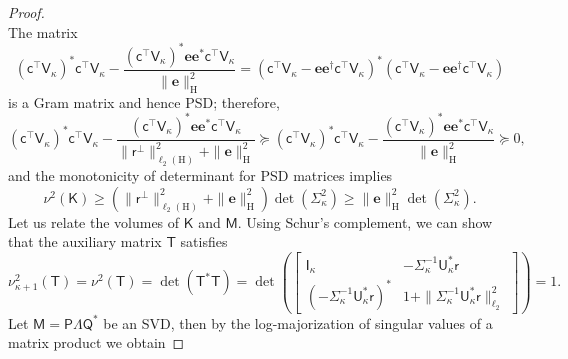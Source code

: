 \documentclass[onefignum,onetabnum]{siamart250211}
\renewenvironment{equation*}{\[}{\]\ignorespacesafterend}
\newcommand{\Hilb}{\mathrm{H}}
\newcommand{\Batrix}[1]{\bm{\Matrix{#1}}}
\newcommand{\Matrix}[1]{\mathsf{#1}}
\newcommand{\Bentry}[1]{{\bm{#1}}}
\newcommand{\trans}{\intercal}
\newcommand{\pinv}{\dagger}
\newcommand{\Norm}[3][]{#1\| #2 #1\|_{\mathrm{#3}}}
\begin{document}
\begin{proof}
\begin{equation*}
\end{equation*}
The matrix
\begin{equation*}
    (\Batrix{c}^\trans \Matrix{V}_{\kappa})^\ast \Batrix{c}^\trans \Matrix{V}_{\kappa} - \frac{(\Batrix{c}^\trans \Matrix{V}_{\kappa})^\ast \Bentry{e} \Bentry{e}^\ast \Batrix{c}^\trans \Matrix{V}_{\kappa}}{\Norm{\Bentry{e}}{\Hilb}^2} = (\Batrix{c}^\trans \Matrix{V}_{\kappa} - \Bentry{e} \Bentry{e}^\pinv \Batrix{c}^\trans \Matrix{V}_{\kappa})^\ast (\Batrix{c}^\trans \Matrix{V}_{\kappa} - \Bentry{e} \Bentry{e}^\pinv \Batrix{c}^\trans \Matrix{V}_{\kappa})
\end{equation*}
is a Gram matrix and hence PSD; therefore,
\begin{equation*}
    (\Batrix{c}^\trans \Matrix{V}_{\kappa})^\ast \Batrix{c}^\trans \Matrix{V}_{\kappa} - \frac{(\Batrix{c}^\trans \Matrix{V}_{\kappa})^\ast \Bentry{e} \Bentry{e}^\ast \Batrix{c}^\trans \Matrix{V}_{\kappa}}{\Norm{\Batrix{r}^\perp}{\ell_2(\Hilb)}^2 + \Norm{\Bentry{e}}{\Hilb}^2} \succcurlyeq (\Batrix{c}^\trans \Matrix{V}_{\kappa})^\ast \Batrix{c}^\trans \Matrix{V}_{\kappa} - \frac{(\Batrix{c}^\trans \Matrix{V}_{\kappa})^\ast \Bentry{e} \Bentry{e}^\ast \Batrix{c}^\trans \Matrix{V}_{\kappa}}{\Norm{\Bentry{e}}{\Hilb}^2} \succcurlyeq 0,
\end{equation*}
and the monotonicity of determinant for PSD matrices implies
\begin{equation*}
    \nu^2(\Batrix{K}) \geq (\Norm{\Batrix{r}^\perp}{\ell_2(\Hilb)}^2 + \Norm{\Bentry{e}}{\Hilb}^2) \det(\Matrix{\Sigma}_{\kappa}^2) \geq \Norm{\Bentry{e}}{\Hilb}^2 \det(\Matrix{\Sigma}_{\kappa}^2).
\end{equation*}
Let us relate the volumes of $\Batrix{K}$ and $\Batrix{M}$.
Using Schur's complement, we can show that the auxiliary matrix $\Matrix{T}$ satisfies
\begin{equation*}
    \nu_{\kappa + 1}^2(\Matrix{T}) = \nu^2(\Matrix{T}) =  \det(\Matrix{T}^\ast \Matrix{T}) = \det\left(\begin{bmatrix}
        \Matrix{I}_{\kappa} & -\Matrix{\Sigma}_\kappa^{-1} \Batrix{U}_\kappa^\ast \Batrix{r} \\
        (-\Matrix{\Sigma}_\kappa^{-1} \Batrix{U}_\kappa^\ast \Batrix{r})^\ast & 1 + \Norm{\Matrix{\Sigma}_\kappa^{-1} \Batrix{U}_\kappa^\ast \Batrix{r}}{\ell_2}^2
    \end{bmatrix}\right) = 1.
\end{equation*}
Let $\Batrix{M} = \Batrix{P} \Matrix{\Lambda} \Matrix{Q}^\ast$ be an SVD, then by the log-majorization of singular values of a matrix product \cite[Thm.~3.3.14]{horn1994topics} we obtain

\end{proof}
\end{document}

